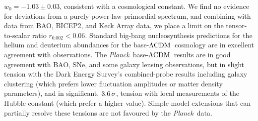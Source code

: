 \documentclass[longauth,traditabstract]{aa}
\def\Planck{\textit{Planck}}
\def\,{\thinspace}
\newcommand{\wzero}{w_0}
\newcommand{\lcdm}{\texorpdfstring{{$\rm{\Lambda CDM}$}}{ΛCDM}}
\newcommand{\planck}{\Planck}
\begin{document}
{$\wzero = -1.03\pm 0.03$, consistent with a cosmological constant.
We find no evidence for deviations from a purely power-law primordial spectrum, and combining with data from BAO, BICEP2, and Keck Array data, we place a limit on the tensor-to-scalar ratio $r_{0.002} < 0.06$.
Standard big-bang nucleosynthesis predictions for the helium and deuterium abundances for the base-\lcdm\ cosmology are in excellent agreement with observations.
The \planck\ base-\lcdm\ results are in good agreement with BAO, SNe, and some galaxy lensing observations, but in slight tension with the Dark Energy Survey's combined-probe results including galaxy clustering (which prefers lower fluctuation amplitudes or matter density parameters), and in significant, $3.6\,\sigma$, tension with local measurements of the Hubble constant (which prefer a higher value). Simple model extensions that can partially resolve these tensions are not favoured by the \planck\ data.
}


\maketitle
\clearpage


\tableofcontents
\end{document}
